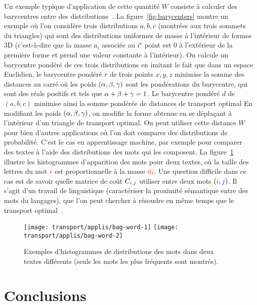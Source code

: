 Un exemple typique d'application de cette quantité $W$ consiste à calculer des barycentres entre des distributions~\cite{agueh2011barycenters}. La figure~\ref{fig:barycenters} montre un exemple où l'on considère trois distributions $a,b,c$ (montrées aux trois sommets du triangles) qui sont des distributions uniformes de masse à l'intérieur de formes 3D (c'est-à-dire que la masse $a_i$ associée au $i^{\text{e}}$ point est 0 à l'extérieur de la première forme et prend une valeur constante à l'intérieur). 
%
On calcule un barycentre pondéré de ces trois distributions en imitant le fait que dans un espace Euclidien, le barycentre pondéré $r$ de trois points $x,y,z$ minimise la somme des distances au carré
où les poids $(\alpha,\beta,\gamma)$ sont les pondérations du barycentre, qui sont des réals positifs et tels que $\alpha+\beta+\gamma=1$.
%
Le barycentre pondéré $d$  de $(a,b,c)$ minimise ainsi la somme pondérée de distances de transport optimal
En modifiant les poids $(\alpha,\beta,\gamma)$, on modifie la forme obtenue en se déplaçant à l'intérieur d'un triangle de transport optimal. 
%
On peut utiliser cette distance $W$ pour bien d'autres applications où l'on doit comparer des distributions de probabilité. C'est le cas en apprentissage machine, par exemple pour comparer des textes à l'aide des distributions des mots qui les composent. La figure~\ref{fig:bagwords} illustre les histogrammes d'apparition des mots pour deux textes, où la taille des lettres du mot ${\color{red}i}$ est proportionnelle à la masse ${\color{red}a}_{\color{red}i}$. Une question difficile dans ce cas est de savoir quelle matrice de coût $C_{{\color{red}i},{\color{blue}j}}$ utiliser entre deux mots $({\color{red}i},{\color{blue}j})$. Il s'agit d'un travail de linguistique (caractériser la proximité sémantique entre des mots du langages), que l'on peut chercher à résoudre en même temps que le transport optimal~\cite{huang2016supervised}. 

\begin{figure}\centering
    \texttt{[image: transport/applis/bag-word-1]}
    \qquad
    \texttt{[image: transport/applis/bag-word-2]}
\caption{\label{fig:bagwords} Exemples d'histogrammes de distributions des mots dans deux textes différents (seuls les mots les plus fréquents sont montrés).  }
\end{figure}


\section*{Conclusions}

